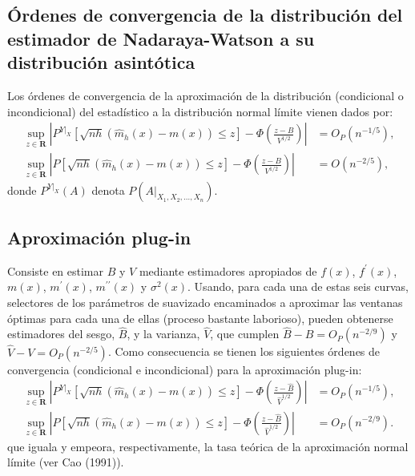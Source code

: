 \documentclass[
]{book}
\theoremstyle{break}
\theoremstyle{definition}
\theoremstyle{definition}
\theoremstyle{definition}
\theoremstyle{definition}
\theoremstyle{remark}
\begin{document}
\hypertarget{uxf3rdenes-de-convergencia-de-la-distribuciuxf3n-del-estimador-de-nadaraya-watson-a-su-distribuciuxf3n-asintuxf3tica}{%
\subsection{Órdenes de convergencia de la distribución del estimador de Nadaraya-Watson a su distribución asintótica}\label{uxf3rdenes-de-convergencia-de-la-distribuciuxf3n-del-estimador-de-nadaraya-watson-a-su-distribuciuxf3n-asintuxf3tica}}

Los órdenes de convergencia de la aproximación de la distribución
(condicional o incondicional) del estadístico a la distribución normal
límite vienen dados por:
\[\begin{aligned}
\sup_{z\in \boldsymbol{R}}\left\vert P^{\left. Y\right\vert _{X}}\left[ 
\sqrt{nh}\left( \hat{m}_{h}\left( x \right) -m\left( x \right) \right) \leq z
\right] -\Phi \left( \frac{z-B}{V^{1/2}} \right) \right\vert &= O_{P}\left(
n^{-1/5} \right), \\
\sup_{z\in \boldsymbol{R}}\left\vert P\left[ \sqrt{nh}\left( \hat{m}
_{h}\left( x \right) -m\left( x \right) \right) \leq z\right] -\Phi \left( 
\frac{z-B}{V^{1/2}} \right) \right\vert &= O\left( n^{-2/5} \right),
\end{aligned}\]
donde \(P^{\left. Y\right\vert_{X}}\left( A \right)\) denota
\(P\left( \left. A \right\vert_{X_1,X_2,\ldots ,X_n} \right)\).

\hypertarget{aproximaciuxf3n-plug-in-1}{%
\subsection{Aproximación plug-in}\label{aproximaciuxf3n-plug-in-1}}

Consiste en estimar \(B\) y \(V\) mediante estimadores apropiados de
\(f\left(x \right)\), \(f^{\prime}\left( x \right)\), \(m\left( x \right)\),
\(m^{\prime}\left( x \right)\), \(m^{\prime \prime }\left( x \right)\) y
\(\sigma^2\left( x \right)\). Usando, para cada una de estas seis curvas,
selectores de los parámetros de suavizado encaminados a aproximar las
ventanas óptimas para cada una de ellas (proceso bastante laborioso),
pueden obtenerse estimadores del sesgo, \(\hat{B}\), y la varianza,
\(\hat{V}\), que cumplen \(\hat{B}-B=O_{P}\left( n^{-2/9} \right)\) y
\(\hat{V}-V=O_{P}\left( n^{-2/5} \right)\).
Como consecuencia se tienen los siguientes órdenes de convergencia
(condicional e incondicional) para la aproximación plug-in:
\[\begin{aligned}
\sup_{z\in \boldsymbol{R}}\left\vert P^{\left. Y\right\vert _{X}}\left[ 
\sqrt{nh}\left( \hat{m}_{h}\left( x \right) -m\left( x \right) \right) \leq z
\right] -\Phi \left( \frac{z-\hat{B}}{\hat{V}^{1/2}} \right) \right\vert
&= O_{P}\left( n^{-1/5} \right), \\
\sup_{z\in \boldsymbol{R}}\left\vert P\left[ \sqrt{nh}\left( \hat{m}
_{h}\left( x \right) -m\left( x \right) \right) \leq z\right] -\Phi \left( 
\frac{z-\hat{B}}{\hat{V}^{1/2}} \right) \right\vert &= O_{P}\left(
n^{-2/9} \right).
\end{aligned}\]
que iguala y empeora, respectivamente,
la tasa teórica de la aproximación normal límite (ver Cao (1991)).
\end{document}
